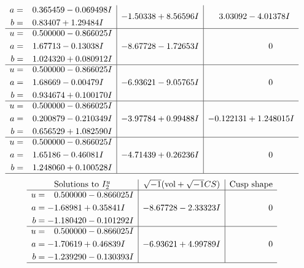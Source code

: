 \documentclass[1p]{elsarticle_modified}
\theoremstyle{definition}
\newcommand{\I}{\sqrt{-1}}
\begin{document}
$$\begin{array}{c|c|c}
\begin{aligned}
a &= \phantom{-}0.365459 - 0.069498 I \\
b &= \phantom{-}0.83407 + 1.29484 I\end{aligned}
 & -1.50338 + 8.56596 I & \phantom{-}3.03092 - 4.01378 I \\ \hline\begin{aligned}
u &= \phantom{-}0.500000 - 0.866025 I \\
a &= \phantom{-}1.67713 - 0.13038 I \\
b &= \phantom{-}1.024320 + 0.080912 I\end{aligned}
 & -8.67728 - 1.72653 I & \phantom{-0.000000 } 0 \\ \hline\begin{aligned}
u &= \phantom{-}0.500000 - 0.866025 I \\
a &= \phantom{-}1.68669 - 0.00479 I \\
b &= \phantom{-}0.934674 + 0.100170 I\end{aligned}
 & -6.93621 - 9.05765 I & \phantom{-0.000000 } 0 \\ \hline\begin{aligned}
u &= \phantom{-}0.500000 - 0.866025 I \\
a &= \phantom{-}0.200879 - 0.210349 I \\
b &= \phantom{-}0.656529 + 1.082590 I\end{aligned}
 & -3.97784 + 0.99488 I & -0.122131 + 1.248015 I \\ \hline\begin{aligned}
u &= \phantom{-}0.500000 - 0.866025 I \\
a &= \phantom{-}1.65186 - 0.46081 I \\
b &= \phantom{-}1.248060 + 0.100528 I\end{aligned}
 & -4.71439 + 0.26236 I & \phantom{-0.000000 } 0\\
 \hline 
 \end{array}$$\newpage$$\begin{array}{c|c|c}  
\text{Solutions to }I^u_{2}& \I (\text{vol} + \sqrt{-1}CS) & \text{Cusp shape}\\
 \hline 
\begin{aligned}
u &= \phantom{-}0.500000 - 0.866025 I \\
a &= -1.68981 + 0.35841 I \\
b &= -1.180420 - 0.101292 I\end{aligned}
 & -8.67728 - 2.33323 I & \phantom{-0.000000 } 0 \\ \hline\begin{aligned}
u &= \phantom{-}0.500000 - 0.866025 I \\
a &= -1.70619 + 0.46839 I \\
b &= -1.239290 - 0.130393 I\end{aligned}
 & -6.93621 + 4.99789 I & \phantom{-0.000000 } 0\\
 \hline 
 \end{array}$$\newpage\newpage\renewcommand{\arraystretch}{1}
\end{document}
